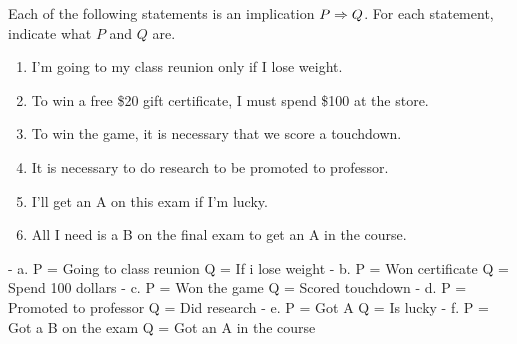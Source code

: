 \documentclass{homework}
\begin{document}
\question Each of the following statements is an implication $P \Rightarrow Q$. For each statement, indicate what $P$ and $Q$ are.
\begin{enumerate}[label=(\alph*)]
    \item I'm going to my class reunion only if I lose weight.

    \item To win a free \$20 gift certificate, I must spend \$100 at the store.

    \item To win the game, it is necessary that we score a touchdown.

    \item It is necessary to do research to be promoted to professor.

    \item I'll get an A on this exam if I'm lucky.
    
    \item All I need is a B on the final exam to get an A in the course. 
  \end{enumerate}
  \begin{sol}
    - a. \smallbreak
    P = Going to class reunion \smallbreak
    Q = If i lose weight \bigbreak
    - b. \smallbreak
    P = Won certificate \smallbreak
    Q = Spend 100 dollars \bigbreak
    - c. \smallbreak
    P = Won the game \smallbreak
    Q = Scored touchdown \bigbreak
    - d. \smallbreak
    P = Promoted to professor \smallbreak
    Q = Did research \bigbreak
    - e. \smallbreak
    P = Got A \smallbreak
    Q = Is lucky \bigbreak
    - f. \smallbreak
    P = Got a B on the exam \smallbreak
    Q = Got an A in the course \smallbreak
  \end{sol}
\end{document}
